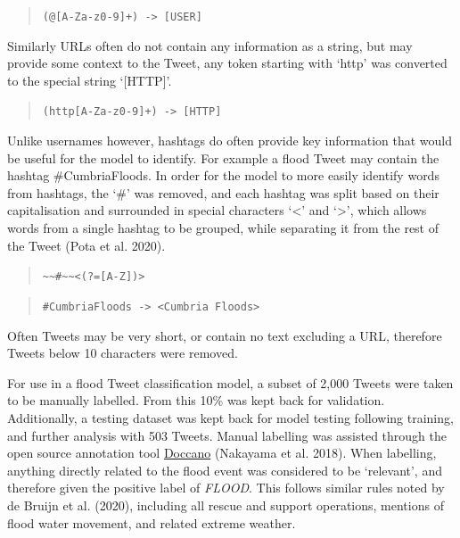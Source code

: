 \documentclass[a4paper, notitlepage]{extreport}
\begin{document}
\begin{quote}
\texttt{(@{[}A-Za-z0-9{]}+)\ -\textgreater{}\ {[}USER{]}}
\end{quote}

Similarly URLs often do not contain any information as a string, but may
provide some context to the Tweet, any token starting with `http' was
converted to the special string `{[}HTTP{]}'.

\begin{quote}
\texttt{(http{[}A-Za-z0-9{]}+)\ -\textgreater{}\ {[}HTTP{]}}
\end{quote}

Unlike usernames however, hashtags do often provide key information that
would be useful for the model to identify. For example a flood Tweet may
contain the hashtag \#CumbriaFloods. In order for the model to more
easily identify words from hashtags, the `\#' was removed, and each
hashtag was split based on their capitalisation and surrounded in
special characters `\textless{}' and `\textgreater{}', which allows
words from a single hashtag to be grouped, while separating it from the
rest of the Tweet (Pota et al. 2020).

\begin{quote}
\texttt{\textasciitilde{}\textasciitilde{}\#\textasciitilde{}\textasciitilde{}\textless{}(?={[}A-Z{]})\textgreater{}}
\end{quote}

\begin{quote}
\texttt{\#CumbriaFloods\ -\textgreater{}\ \textless{}Cumbria\ Floods\textgreater{}}
\end{quote}

Often Tweets may be very short, or contain no text excluding a URL,
therefore Tweets below 10 characters were removed.

For use in a flood Tweet classification model, a subset of 2,000 Tweets
were taken to be manually labelled. From this 10\% was kept back for
validation. Additionally, a testing dataset was kept back for model
testing following training, and further analysis with 503 Tweets. Manual
labelling was assisted through the open source annotation tool
\href{https://github.com/doccano/doccano}{Doccano} (Nakayama et al.
2018). When labelling, anything directly related to the flood event was
considered to be `relevant', and therefore given the positive label of
\emph{FLOOD}. This follows similar rules noted by de Bruijn et al.
(2020), including all rescue and support operations, mentions of flood
water movement, and related extreme weather.
\end{document}
